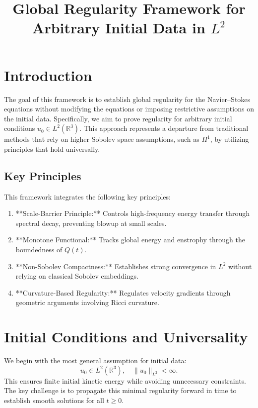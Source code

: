 \documentclass[12pt]{article}
\theoremstyle{definition}
\begin{document}
\title{Global Regularity Framework for Arbitrary Initial Data in $L^2$}
\author{}
\date{}
\maketitle

\section{Introduction}
The goal of this framework is to establish global regularity for the Navier--Stokes equations without modifying the equations or imposing restrictive assumptions on the initial data. Specifically, we aim to prove regularity for arbitrary initial conditions $u_0 \in L^2(\mathbb{R}^3)$. This approach represents a departure from traditional methods that rely on higher Sobolev space assumptions, such as $H^1$, by utilizing principles that hold universally.

\subsection{Key Principles}
This framework integrates the following key principles:
\begin{enumerate}
    \item **Scale-Barrier Principle:** Controls high-frequency energy transfer through spectral decay, preventing blowup at small scales.
    \item **Monotone Functional:** Tracks global energy and enstrophy through the boundedness of $Q(t)$.
    \item **Non-Sobolev Compactness:** Establishes strong convergence in $L^2$ without relying on classical Sobolev embeddings.
    \item **Curvature-Based Regularity:** Regulates velocity gradients through geometric arguments involving Ricci curvature.
\end{enumerate}

\section{Initial Conditions and Universality}

We begin with the most general assumption for initial data:
\begin{equation}
    u_0 \in L^2(\mathbb{R}^3), \quad \|u_0\|_{L^2} < \infty.
\end{equation}
This ensures finite initial kinetic energy while avoiding unnecessary constraints. The key challenge is to propagate this minimal regularity forward in time to establish smooth solutions for all $t \geq 0$.
\end{document}
